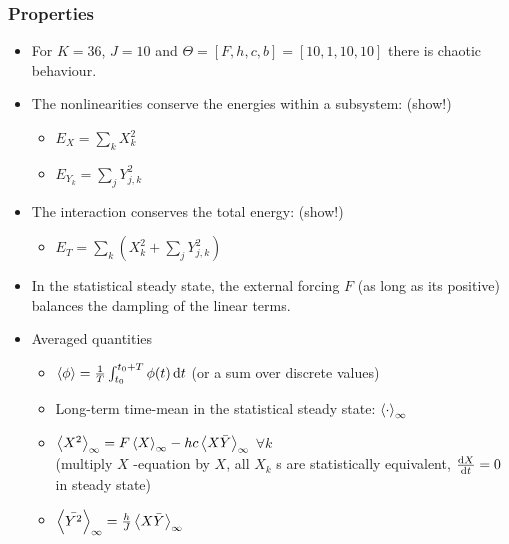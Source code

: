 \documentclass[11pt]{article}
\begin{document}
\subsubsection{Properties}
\label{sec:org9852455}

\begin{itemize}
\item For \(K=36\), \(J=10\) and \(\Theta = [F, h, c, b] = [10, 1, 10, 10]\) there is chaotic behaviour.

\item The nonlinearities conserve the energies within a subsystem: (show!)
\begin{itemize}
\item \(E_X = \sum_k X_k^2\)
\item \(E_{Y_k} = \sum_j Y_{j,k}^2\)
\end{itemize}

\item The interaction conserves the total energy: (show!)
\begin{itemize}
\item \(E_{T} = \sum_k (X_k^2 + \sum_j Y_{j,k}^2)\)
\end{itemize}

\item In the statistical steady state, the external forcing \(F\) (as long as its positive) balances
the dampling of the linear terms.

\item Averaged quantities
\begin{itemize}
\item \(\expval{\phi} = \frac{1}{T} \int_{t_0}^{t_0 + T} \phi(t) \dd{t}\) (or a sum over discrete values)
\item Long-term time-mean in the statistical steady state: \(\expval{\cdot}_{\infty}\)
\item \(\expval{X^2}_\infty = F \expval{X}_{\infty} - hc \expval{X\bar{Y}}_\infty\) \(\forall k\) \\
(multiply \(X\) -equation by \(X\), all \(X_k\) s are statistically equivalent, \(\dv{X}{t} = 0\) in steady state)
\item \(\expval{\bar{Y^2}}_{\infty} = \frac{h}{J} \expval{X \bar{Y}}_{\infty}\)
\end{itemize}
\end{itemize}



\end{document}
